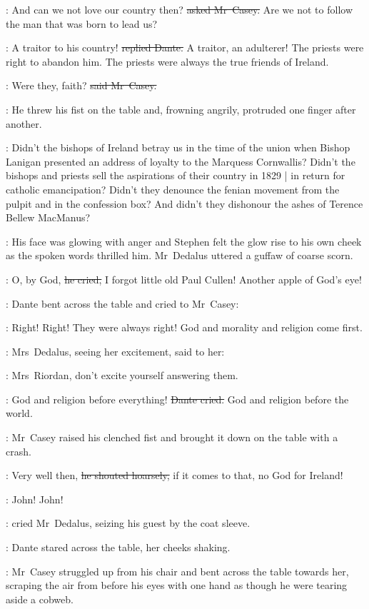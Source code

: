\casey:
And can we not love our country then?
\sout{asked Mr~Casey.}
Are we not to follow the man that was born to lead us?

\dante:
A traitor to his country!
\sout{replied Dante.}
A traitor, an adulterer!
The priests were right to abandon him.
The priests were always the true friends of Ireland.

\casey:
Were they, faith?
\sout{said Mr~Casey.}

:
He threw his fist on the table
and, frowning angrily,
protruded one finger after another.

\casey:
Didn’t the bishops of Ireland
betray us in the time of the union
when Bishop Lanigan presented an address of loyalty
to the Marquess Cornwallis?
Didn’t the bishops and priests
sell the aspirations of their country in 1829 |
in return for catholic emancipation?
Didn’t they denounce the fenian movement
from the pulpit and in the confession box?
And didn’t they dishonour the ashes of Terence Bellew MacManus?

:
His face was glowing with anger
and Stephen felt the glow rise to his own cheek
as the spoken words thrilled him.
Mr~Dedalus uttered a guffaw of coarse scorn.

\simon:
O, by God,
\sout{he cried,}
I forgot little old Paul Cullen!
Another apple of God’s eye!

:
Dante bent across the table and cried to Mr~Casey:

\dante:
Right!
Right!
They were always right!
God and morality and religion come first.

:
Mrs~Dedalus,
seeing her excitement,
said to her:

\marydedalus:
Mrs~Riordan,
don’t excite yourself answering them.

\dante:
God and religion before everything!
\sout{Dante cried.}
God and religion before the world.

:
Mr~Casey raised his clenched fist
and brought it down on the table with a crash.

\casey:
Very well then,
\sout{he shouted hoarsely,}
if it comes to that,
no God for Ireland!

\simon:
John!
John!

:
cried Mr~Dedalus,
seizing his guest by the coat sleeve.

:
Dante stared across the table,
her cheeks shaking.

:
Mr~Casey struggled up from his chair
and bent across the table towards her,
scraping the air from before his eyes with one hand
as though he were tearing aside a cobweb.

